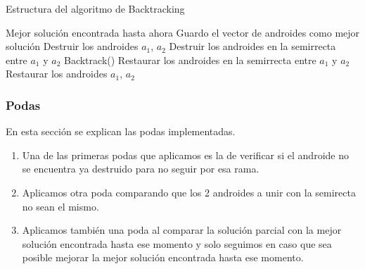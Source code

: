 \begin{algorithm}[h!]
\caption{Estructura del algoritmo de Backtracking}
\begin{algorithmic}[1]
		\State Mejor solución encontrada hasta ahora
		\State Guardo el vector de androides como mejor solución
	\Else
                    \State Destruir los androides $a_1$, $a_2$
                    \State Destruir los androides en la semirrecta entre $a_1$ y $a_2$
                    \State Backtrack()
                    \State Restaurar los androides en la semirrecta entre $a_1$ y $a_2$
                    \State Restaurar los androides $a_1$, $a_2$                        
                \EndIf
            \EndIf
		\EndFor
	\EndIf
	\EndFunction
\end{algorithmic}
\end{algorithm}

\subsubsection{Podas}
En esta sección se explican las podas implementadas.

\begin{enumerate}
\item Una de las primeras podas que aplicamos es la de verificar si el androide no se encuentra ya destruido para no seguir por esa rama.
\item Aplicamos otra poda comparando que los 2 androides a unir con la semirecta no sean el mismo.
\item Aplicamos también una poda al comparar la solución parcial con la mejor solución encontrada hasta ese momento y solo seguimos en caso que sea posible mejorar la mejor solución encontrada hasta ese momento.
\end{enumerate}


